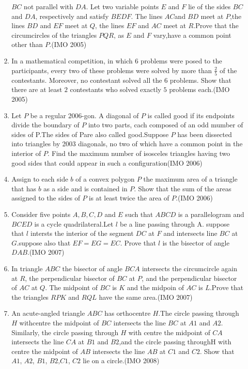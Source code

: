 \begin{enumerate}
    $BC$ not parallel with $DA$. Let two variable points $E$ and $F$ lie of the sides $BC$ and $DA$, respectively and satisfy $BEDF$. The lines $AC$and $BD$ meet at $P$,the lines $BD$ and $EF$ meet at $Q$, the lines $EF$ and $AC$ meet at $R$.Prove that the circumcircles of the triangles $PQR$, as $E$ and $F$ vary,have a common point other than $P$.\hfill(IMO 2005)
 \item In a mathematical competition, in which $6$ problems were posed to the participants, every two of these problems were solved by more than $\frac{2}{5}$ of the contestants. Moreover, no contestant solved all the $6$ problems. Show that there are at least $2$ contestants who solved exactly $5$ problems each.\hfill(IMO 2005)
\item Let $P$ be a regular 2006-gon. A diagonal of $P$ is called good if its endpoints divide the boundary of $P$ into two parts, cach composed of an odd mumber of sides of P.The sides of Pare also called good.Suppose $P$ has been dissected into triangles by 2003 diagonals, no two of which have a common point in the interior of $P$. Find the maximum number  of isosceles triangles having two good sides that could appear in such a configuration\hfill(IMO 2006)
\item Assign to each side $b$ of a convex polygon $P$ the maximum area of a triangle that has $b$ as a side and is contained in $P$. Show that the sum of the areas assigned to the sides of $P$ is at least twice the area of $P$.\hfill(IMO 2006)
\item Consider five points $A,B,C,D$ and $E$ such that $ABCD$ is a parallelogram and $BCED$ is a cycle quadrilateral.Let $l$ be a line passing through A. suppose that $l$ intersts the interior of the segment $DC$ at $F$ and intersects line $BC$ at $G$.suppose also that $EF=EG=EC$. Prove that $l$ is the bisector of angle $DAB$.\hfill(IMO 2007)
	\item In triangle $ABC$ the bisector of angle $BCA$ intersects the circumcircle again at $R$, the perpendicular bisector of $BC$ at $P$, and the perpendicular bisector of $AC$ at $Q$. The midpoint of $BC$ is $K$ and the midpoin of $AC$ is $L$.Prove that the triangles $RPK$ and $RQL$ have the same area.\hfill(IMO 2007)
	\item An acute-angled triangle $ABC$ has orthocentre $H$.The circle passing through $H$ withcentre the midpoint of $BC$ intersects the line $BC$ at $A1$ and $A2$. Similarly, the circle passing through $H$ with centre the midpoint of $CA$ intersects the line $CA$ at $B1$ and $B2$,and the circle passing throughH with centre the midpoint of $AB$ intersects the line $AB$ at $C1$ and $C2$. Show that $A1$, $A2$, $B1$, $B2$,$C1$, $C2$ lie on a circle.\hfill(IMO 2008)

\end{enumerate}
